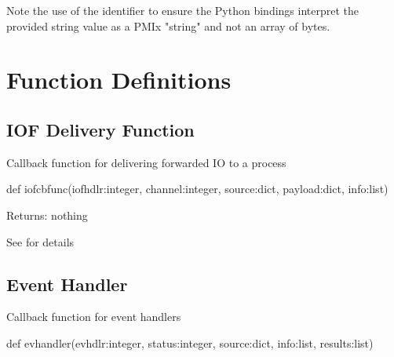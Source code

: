 Note the use of the  identifier to ensure the Python bindings interpret the provided string value as a \ac{PMIx} "string" and not an array of bytes.

\section{Function Definitions}
\label{app:python:fns}

\subsection{IOF Delivery Function}

\summary

Callback function for delivering forwarded \ac{IO} to a process

\format

\pyspecificstart
\begin{codepar}
def iofcbfunc(iofhdlr:integer, channel:integer,
              source:dict, payload:dict, info:list)
\end{codepar}
\pyspecificend

\begin{arglist}
\end{arglist}

Returns: nothing

See  for details


\subsection{Event Handler}

\summary

Callback function for event handlers

\format

\pyspecificstart
\begin{codepar}
def evhandler(evhdlr:integer, status:integer,
              source:dict, info:list, results:list)
\end{codepar}
\pyspecificend

